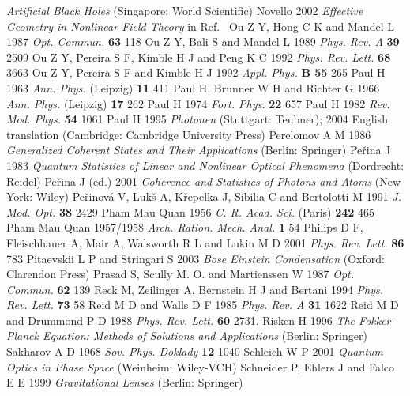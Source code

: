\documentclass[12pt,amsmath,amssymb]{article}
\numberwithin{equation}{section}
\begin{document}
\begin{thebibliography}{999}
{\it Artificial Black Holes}
(Singapore: World Scientific)
Novello 2002
{\it Effective Geometry in Nonlinear Field Theory}
in Ref.\ \cite{Novello}
Ou Z Y, Hong C K and Mandel L 1987
{\it Opt. Commun.} {\bf 63} 118
Ou Z Y, Bali S and Mandel L 1989
{\it Phys. Rev. A} {\bf 39} 2509
Ou Z Y, Pereira S F, Kimble H J and Peng K C 1992
{\it Phys. Rev. Lett.} {\bf 68} 3663
Ou Z Y, Pereira S F and Kimble H J 1992
{\it Appl. Phys.} {\bf B 55} 265
Paul H 1963
{\it Ann. Phys.} (Leipzig) {\bf 11} 411
Paul H, Brunner W H and Richter G 1966 {\it Ann. Phys.} (Leipzig)
{\bf 17} 262
Paul H 1974 {\it Fort. Phys.} {\bf 22} 657
Paul H 1982 {\it Rev. Mod. Phys.} {\bf 54} 1061
Paul H 1995 {\it Photonen} (Stuttgart: Teubner); 2004 English translation
(Cambridge: Cambridge University Press)
Perelomov A M 1986
{\it Generalized Coherent States and Their Applications}
(Berlin: Springer)
Pe\v{r}ina J 1983
{\it Quantum Statistics of Linear and Nonlinear Optical Phenomena}
(Dordrecht: Reidel)
Pe\v{r}ina J (ed.) 2001
{\it Coherence and Statistics of Photons and Atoms}
(New York: Wiley)
Pe\v{r}inov\'a V, Luk\v{s} A, K\v{r}epelka J,
Sibilia C and Bertolotti M 1991
{\it J. Mod. Opt.} {\bf 38} 2429
Pham Mau Quan 1956
{\it C. R. Acad. Sci.} (Paris) {\bf 242} 465
Pham Mau Quan 1957/1958
{\it Arch. Ration. Mech. Anal.} {\bf 1} 54
Philips D F, Fleischhauer A, Mair A, Walsworth R L and Lukin M D
2001 {\it Phys. Rev. Lett.} {\bf 86} 783
Pitaevskii L P and Stringari S 2003
{\it Bose Einstein Condensation}
(Oxford: Clarendon Press)
Prasad S, Scully M. O. and Martienssen W 1987
{\it Opt. Commun.} {\bf 62} 139
Reck M, Zeilinger A, Bernstein H J and Bertani 1994 {\it Phys.
Rev. Lett.} {\bf 73} 58
Reid M D and Walls D F 1985
{\it Phys. Rev. A} {\bf 31} 1622
Reid M D and Drummond P D 1988
{\it Phys. Rev. Lett.} {\bf 60} 2731.
Risken H 1996
{\it The Fokker-Planck Equation: Methods of Solutions and
Applications}
(Berlin: Springer)
Sakharov A D 1968
{\it Sov. Phys. Doklady} {\bf 12} 1040
Schleich W P 2001
{\it Quantum Optics in Phase Space}
(Weinheim: Wiley-VCH)
Schneider P, Ehlers J and Falco E E 1999
{\it Gravitational Lenses}
(Berlin: Springer)

\end{thebibliography}
\end{document}
